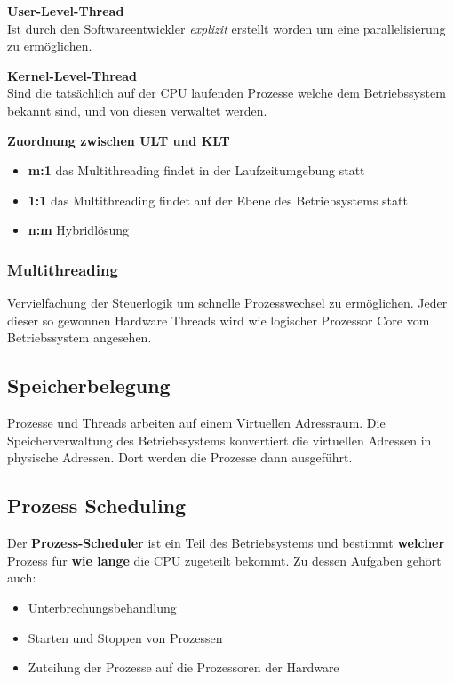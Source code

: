 \documentclass[10pt,a4paper]{article}
\begin{document}
\begin{multicols*}{4}
\textbf{User-Level-Thread}\hfill\\
Ist durch den Softwareentwickler \textit{explizit} erstellt
worden um eine parallelisierung zu ermöglichen.

\textbf{Kernel-Level-Thread}\hfill\\
Sind die tatsächlich auf der CPU laufenden Prozesse welche
dem Betriebssystem bekannt sind, und von diesen verwaltet werden.

\textbf{Zuordnung zwischen ULT und KLT}\hfill
\begin{itemize}
	\item \textbf{m:1} das Multithreading findet in der Laufzeitumgebung statt
	\item \textbf{1:1} das Multithreading findet auf der Ebene des Betriebsystems statt
	\item \textbf{n:m} Hybridlösung
\end{itemize}

\subsubsection{Multithreading}\label{subsubsec:multithreading}
Vervielfachung der Steuerlogik um schnelle Prozesswechsel zu ermöglichen. Jeder dieser so gewonnen Hardware Threads
wird wie logischer Prozessor Core vom Betriebssystem angesehen.

\subsection{Speicherbelegung}\label{subsec:speicherbelegung}
Prozesse und Threads arbeiten auf einem Virtuellen Adressraum. Die Speicherverwaltung des Betriebssystems
konvertiert die virtuellen Adressen in physische Adressen. Dort werden die Prozesse dann ausgeführt.

\subsection{Prozess Scheduling}\label{subsec:prozess-scheduling}

Der \textbf{Prozess-Scheduler} ist ein Teil des Betriebsystems und bestimmt \textbf{welcher} Prozess für
\textbf{wie lange} die CPU zugeteilt bekommt. Zu dessen Aufgaben gehört auch:
\begin{itemize}
	\item Unterbrechungsbehandlung
	\item Starten und Stoppen von Prozessen
	\item Zuteilung der Prozesse auf die Prozessoren der Hardware
\end{itemize}


\end{multicols*}
\end{document}
